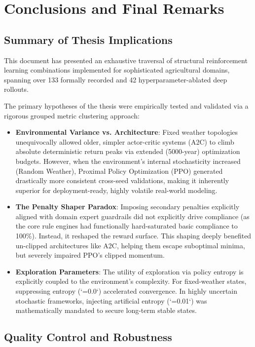 \chapter{Conclusions and Final Remarks}
\label{chap:conclusion}

\section{Summary of Thesis Implications}

This document has presented an exhaustive traversal of structural reinforcement learning combinations implemented for sophisticated agricultural domains, spanning over 133 formally recorded and 42 hyperparameter-ablated deep rollouts. 

The primary hypotheses of the thesis were empirically tested and validated via a rigorous grouped metric clustering approach:
\begin{itemize}
    \item \textbf{Environmental Variance vs. Architecture}: Fixed weather topologies unequivocally allowed older, simpler actor-critic systems (A2C) to climb absolute deterministic return peaks via extended (5000-year) optimization budgets. However, when the environment's internal stochasticity increased (Random Weather), Proximal Policy Optimization (PPO) generated drastically more consistent cross-seed validations, making it inherently superior for deployment-ready, highly volatile real-world modeling.
    \item \textbf{The Penalty Shaper Paradox}: Imposing secondary penalties explicitly aligned with domain expert guardrails did not explicitly drive compliance (as the core rule engines had functionally hard-saturated basic compliance to 100\%). Instead, it reshaped the reward surface. This shaping deeply benefited un-clipped architectures like A2C, helping them escape suboptimal minima, but severely impaired PPO's clipped momentum.
    \item \textbf{Exploration Parameters}: The utility of exploration via policy entropy is explicitly coupled to the environment's complexity. For fixed-weather states, suppressing entropy (`=0.0`) accelerated convergence. In highly uncertain stochastic frameworks, injecting artificial entropy (`=0.01`) was mathematically mandated to secure long-term stable states.
\end{itemize}

\section{Quality Control and Robustness}

